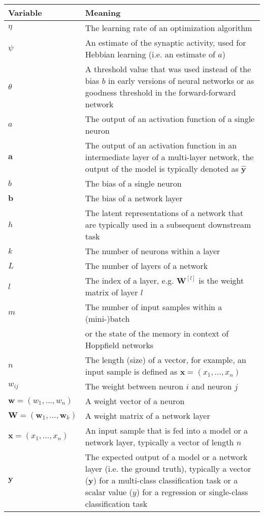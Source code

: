 \begin{tabular}{ p{3cm} p{11cm} }
	\textbf{Variable} & \textbf{Meaning}\\
	\hline
	$\eta$ & The learning rate of an optimization algorithm\\
	$\psi$ & An estimate of the synaptic activity, used for Hebbian learning (i.e. an estimate of $a$)\\
	$\theta$ & A threshold value that was used instead of the bias $b$ in early versions of neural networks or as goodness threshold in the forward-forward network\\
	$a$ & The output of an activation function of a single neuron\\
	$\boldsymbol{a}$ & The output of an activation function in an intermediate layer of a multi-layer network, the output of the model is typically denoted as $\boldsymbol{\hat{y}}$\\
	$b$ & The bias of a single neuron\\
	$\boldsymbol{b}$ & The bias of a network layer\\
	$h$ & The latent representations of a network that are typically used in a subsequent downstream task\\
	$k$ & The number of neurons within a layer\\
	$L$ & The number of layers of a network\\
	$l$ & The index of a layer, e.g. $\boldsymbol{W}^{[l]}$ is the weight matrix of layer $l$\\
	$m$ & The number of input samples within a (mini-)batch\\
	    & or the state of the memory in context of Hoppfield networks\\
	$n$ & The length (size) of a vector, for example, an input sample is defined as $\boldsymbol{x} = (x_1, ..., x_n)$\\
	$w_{ij}$ & The weight between neuron $i$ and neuron $j$\\
	$\boldsymbol{w} = (w_1, ..., w_n)$ & A weight vector of a neuron\\
	$\boldsymbol{W} = (\boldsymbol{w}_1, ..., \boldsymbol{w}_k)$ & A weight matrix of a network layer\\
	$\boldsymbol{x} = (x_1, ..., x_n)$ & An input sample that is fed into a model or a network layer, typically a vector of length $n$\\
	$\boldsymbol{y}$ & The expected output of a model or a network layer (i.e. the ground truth), typically a vector ($\boldsymbol{y}$) for a multi-class classification task or a scalar value ($y$) for a regression or single-class classification task\\

\end{tabular}
